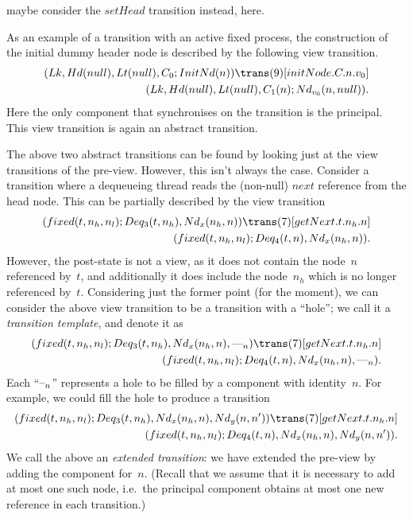  maybe consider the $setHead$ transition instead, here. 

As an example of a transition with an active fixed process, the construction
of the initial dummy header node is described by the following view
transition.
\[
\begin{align}
(\Lock, \Head(null), \Last(null), \Con_0; \InitNode(n)) 
  \trans(9)[initNode.C.n.v_0] \\
\qquad (\Lock, \Head(null), \Last(null), \Con_1(n); \Node_{v_0}(n, null)).
\end{align}
\]
Here the only component that synchronises on the transition is the principal.
This view transition is again an abstract transition.

The above two abstract transitions can be found by looking just at the view
transitions of the pre-view.  However, this isn't always the case.
%
Consider a transition where a dequeueing thread reads the (non-null) $next$
reference from the head node.  This can be partially described by the view
transition
\[
\begin{align}
(fixed(t, n_h, n_l); Deq_3(t, n_h), \Node_x(n_h, n))
  \trans(7)[getNext.t.n_h.n] \\
\qquad (fixed(t, n_h, n_l); Deq_4(t, n), \Node_x(n_h, n)).
\end{align}
\]
However, the post-state is not a view, as it does not contain the node~$n$
referenced by~$t$, and additionally it does include the node~$n_h$ which is no
longer referenced by~$t$.  Considering just the former point (for the moment),
we can consider the above view transition to be a transition with a ``hole'';
we call it a \emph{transition template}, and denote it as
\[
\begin{align}
(fixed(t, n_h, n_l); Deq_3(t, n_h), \Node_x(n_h, n), \bighole{n})
  \trans(7)[getNext.t.n_h.n] \\
\qquad (fixed(t, n_h, n_l); Deq_4(t, n), \Node_x(n_h, n), \bighole{n}).
\end{align}
\]
Each ``$\mbox{--}_{n}$'' represents a hole to be filled by a component with
identity~$n$.  For example, we could fill the hole to produce a transition
\begin{equation}
\begin{align}
(fixed(t, n_h, n_l); Deq_3(t, n_h), \Node_x(n_h, n), \Node_y(n, n'))
  \trans(7)[getNext.t.n_h.n] \\
\qquad (fixed(t, n_h, n_l);   Deq_4(t, n), \Node_x(n_h, n), \Node_y(n, n')).
\label{trans:getNext}
\end{align}
\end{equation}
%
We call the above an \emph{extended transition}: we have extended the pre-view
by adding the component for~$n$.  (Recall that we assume that it is necessary
to add at most one such node, i.e.~the principal component obtains at most one
new reference in each transition.)  

